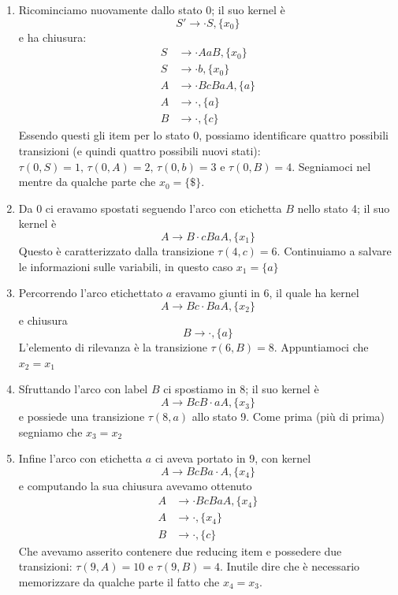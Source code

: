 \documentclass[class=book, crop=false, oneside, 12pt]{standalone}
\begin{document}
\begin{enumerate}
    \item Ricominciamo nuovamente dallo stato 0; il suo kernel è 
    \begin{equation*}
        S' \to \cdot S, \{x_0\}
    \end{equation*}
    e ha chiusura:
    \begin{align*}
        S &\to \cdot AaB, \{x_0\} \\
        S &\to \cdot b, \{x_0\} \\
        A &\to \cdot BcBaA, \{a\} \\
        A &\to \cdot, \{a\} \\
        B &\to \cdot, \{c\}
    \end{align*}
    Essendo questi gli item per lo stato 0, possiamo identificare quattro possibili transizioni (e quindi quattro possibili nuovi stati): \(\tau(0,S)=1 \textrm{, } \tau(0,A)=2 \textrm{, } \tau(0,b)=3 \textrm{ e } \tau(0,B)=4\). Segniamoci nel mentre da qualche parte che \(x_0 = \{\$\}\).
    \item Da 0 ci eravamo spostati seguendo l'arco con etichetta \(B\) nello stato 4; il suo kernel è 
    \begin{equation*}
        A \to B \cdot cBaA, \{x_1\} 
    \end{equation*}
    Questo è caratterizzato dalla transizione \(\tau(4,c) = 6\). Continuiamo a salvare le informazioni sulle variabili, in questo caso \(x_1 = \{a\}\)
    \item Percorrendo l'arco etichettato \(a\) eravamo giunti in 6, il quale ha kernel
    \begin{equation*}
        A \to Bc \cdot BaA, \{x_2\} 
    \end{equation*}
    e chiusura
    \begin{equation*}
         B \to \cdot, \{a\} 
    \end{equation*}
    L'elemento di rilevanza è la transizione \(\tau(6, B)=8\). Appuntiamoci che \(x_2 = x_1\)
    \item Sfruttando l'arco con label \(B\) ci spostiamo in 8; il suo kernel è
    \begin{equation*}
        A \to BcB \cdot aA, \{x_3\} 
    \end{equation*}
    e possiede una transizione \(\tau(8, a)\) allo stato 9. Come prima (più di prima) segniamo che \(x_3 = x_2\)
    \item Infine l'arco con etichetta \(a\) ci aveva portato in 9, con kernel
    \begin{equation*}
        A \to BcBa \cdot A, \{x_4\} 
    \end{equation*}
    e computando la sua chiusura avevamo ottenuto
    \begin{align*}
        A &\to \cdot BcBaA, \{x_4\} \\
        A &\to \cdot, \{x_4\} \\
        B &\to \cdot, \{c\}
    \end{align*}
    Che avevamo asserito contenere due reducing item e possedere due transizioni: \(\tau(9, A)=10\) e \(\tau(9, B)=4\). Inutile dire che è necessario memorizzare da qualche parte il fatto che \(x_4 = x_3\).
    

\end{enumerate}
\end{document}
